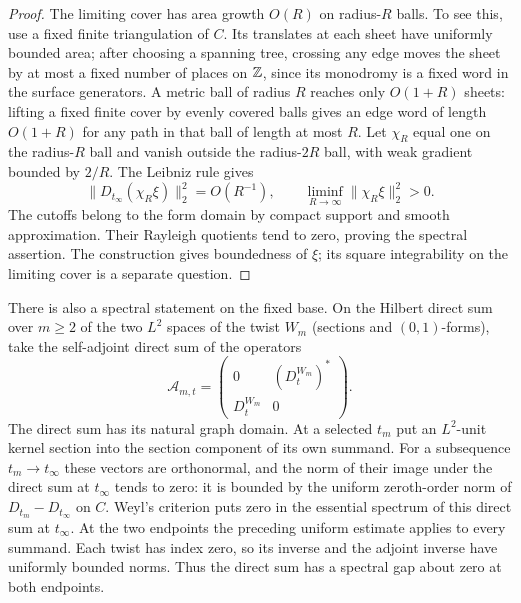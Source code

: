 \begin{proof}
The limiting cover has area growth $O(R)$ on radius-$R$ balls. To see
this, use a fixed finite triangulation of $C$. Its translates at each
sheet have uniformly bounded area; after choosing a spanning tree,
crossing any edge moves the sheet by at most a fixed number of places
on $\mathbb Z$, since its monodromy is a fixed word in the surface
generators. A metric ball of radius $R$ reaches only $O(1+R)$ sheets:
lifting a fixed finite cover by evenly covered balls gives an edge
word of length $O(1+R)$ for any path in that ball of length at most
$R$. Let $\chi_R$ equal one on the radius-$R$ ball and vanish outside
the radius-$2R$ ball, with weak gradient bounded by $2/R$.
The Leibniz rule gives
\[
   \|D_{t_\infty}(\chi_R\xi)\|_2^2=O(R^{-1}),
     \qquad \liminf_{R\to\infty}\|\chi_R\xi\|_2^2>0.
\]
The cutoffs belong to the form domain by compact support and smooth
approximation. Their Rayleigh quotients tend to zero, proving the
spectral assertion. The construction gives boundedness of $\xi$;
its square integrability on the limiting cover is a separate question.
\end{proof}

There is also a spectral statement on the fixed base. On the Hilbert
direct sum over $m\ge2$ of the two $L^2$ spaces of the twist $W_m$
(sections and $(0,1)$-forms), take the self-adjoint direct sum of the
operators
\[
  \mathcal A_{m,t}=
  \begin{pmatrix}0&(D_t^{W_m})^*\\ D_t^{W_m}&0\end{pmatrix}.
\]
The direct sum has its natural graph domain. At a selected $t_m$ put
an $L^2$-unit kernel section into the section component of its own
summand. For a subsequence $t_m\to t_\infty$ these vectors are
orthonormal, and the norm of their image under the direct sum at
$t_\infty$ tends to zero: it is bounded by the uniform zeroth-order
norm of $D_{t_m}-D_{t_\infty}$ on $C$. Weyl's criterion puts zero in
the essential spectrum of this direct sum at $t_\infty$. At the two
endpoints the preceding uniform estimate applies to every summand.
Each twist has index zero, so its inverse and the adjoint inverse
have uniformly bounded norms. Thus the direct sum has a spectral gap
about zero at both endpoints.

